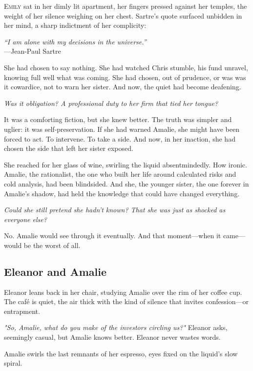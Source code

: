\lettrine{E}{mily} sat in her dimly lit apartment, her fingers pressed against her temples, the weight of her silence weighing on her chest. Sartre's quote surfaced unbidden in her mind, a sharp indictment of her complicity:

\begin{displayquote}
    \textit{“I am alone with my decisions in the universe.”} \\
    —Jean-Paul Sartre
\end{displayquote}

She had chosen to say nothing. She had watched Chris stumble, his fund unravel, knowing full well what was coming. She had chosen, out of prudence, or was was it cowardice, not to warn her sister. And now, the quiet had become deafening.

\textit{Was it obligation? A professional duty to her firm that tied her tongue?} 

It was a comforting fiction, but she knew better. The truth was simpler and uglier: it was self-preservation. If she had warned Amalie, she might have been forced to act. To intervene. To take a side. And now, in her inaction, she had chosen the side that left her sister exposed. 

She reached for her glass of wine, swirling the liquid absentmindedly. How ironic. Amalie, the rationalist, the one who built her life around calculated risks and cold analysis, had been blindsided. And she, the younger sister, the one forever in Amalie’s shadow, had held the knowledge that could have changed everything. 

\textit{Could she still pretend she hadn't known? That she was just as shocked as everyone else?} 

No. Amalie would see through it eventually. And that moment—when it came—would be the worst of all.


\subsection*{Eleanor and Amalie}
Eleanor leans back in her chair, studying Amalie over the rim of her coffee cup. The café is quiet, the air thick with the kind of silence that invites confession—or entrapment. 

\textit{"So, Amalie, what do you make of the investors circling us?"} Eleanor asks, seemingly casual, but Amalie knows better. Eleanor never wastes words. 

Amalie swirls the last remnants of her espresso, eyes fixed on the liquid’s slow spiral. 

